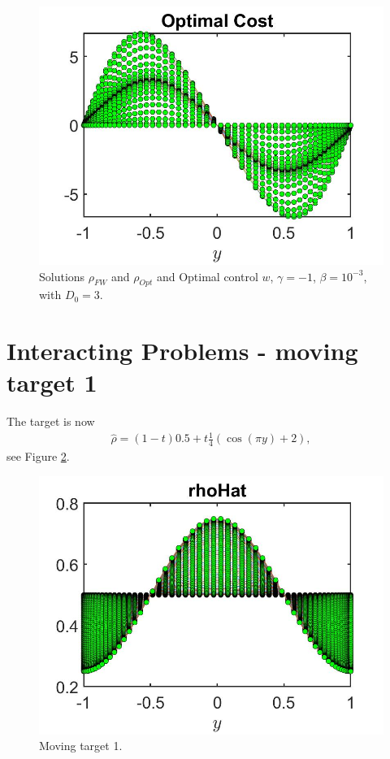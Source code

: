 \documentclass[11pt, a4paper]{article}
\theoremstyle{definition}
\begin{document}
\begin{figure}[h]
		\includegraphics[scale=0.3]{wOpt03D3.jpg}
		\caption{Solutions $\rho_{FW}$ and $\rho_{Opt}$ and Optimal control $w$, $\gamma = - 1$, $\beta = 10^{-3}$, with $D_0 = 3$.}
		\label{rhoD03D3}
	\end{figure}

\section{Interacting Problems - moving target 1}
The target is now
\begin{align*}
\hat \rho = (1-t)0.5 + t\frac{1}{4}(\cos(\pi y) + 2),
\end{align*}
see Figure \ref{rhoHat3}.

\begin{figure}[h]
	\includegraphics[scale=0.3]{rhoHat3.jpg}
	\caption{Moving target 1.}
	\label{rhoHat3}
\end{figure}
\end{document}
